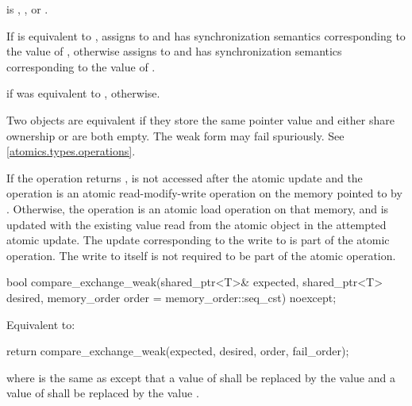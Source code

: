 \begin{itemdescr}
\pnum
\expects
{} is
,
, or
.

\pnum
\effects
If  is equivalent to ,
assigns  to  and
has synchronization semantics corresponding to the value of ,
otherwise assigns  to  and
has synchronization semantics corresponding to the value of .

\pnum
\returns
{} if  was equivalent to ,
 otherwise.

\pnum
\remarks
Two  objects are equivalent if
they store the same pointer value and
either share ownership or are both empty.
The weak form may fail spuriously. See \ref{atomics.types.operations}.

\pnum
If the operation returns ,
 is not accessed after the atomic update and
the operation is an atomic read-modify-write operation
on the memory pointed to by .
Otherwise, the operation is an atomic load operation on that memory, and
 is updated with the existing value
read from the atomic object in the attempted atomic update.
The  update corresponding to the write to 
is part of the atomic operation.
The write to  itself
is not required to be part of the atomic operation.
\end{itemdescr}

%
\begin{itemdecl}
bool compare_exchange_weak(shared_ptr<T>& expected, shared_ptr<T> desired,
                           memory_order order = memory_order::seq_cst) noexcept;
\end{itemdecl}

\begin{itemdescr}
\pnum
\effects
Equivalent to:
\begin{codeblock}
return compare_exchange_weak(expected, desired, order, fail_order);
\end{codeblock}
where  is the same as 
except that a value of 
shall be replaced by the value  and
a value of 
shall be replaced by the value .
\end{itemdescr}

